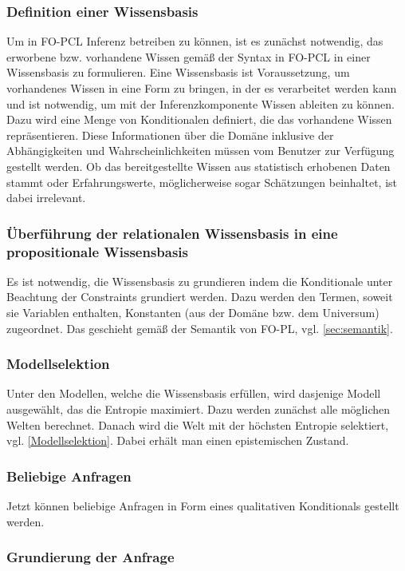 \documentclass[draft]{scrreprt}
\begin{document}
\subsubsection{Definition einer Wissensbasis}	
Um in FO-PCL Inferenz betreiben zu können, ist es zunächst notwendig, das erworbene bzw. vorhandene Wissen gemäß der Syntax in FO-PCL in einer Wissensbasis zu formulieren. Eine Wissensbasis ist Voraussetzung, um vorhandenes Wissen in eine Form zu bringen, in der es verarbeitet werden kann und ist notwendig, um mit der Inferenzkomponente Wissen ableiten zu können. Dazu wird eine Menge von Konditionalen definiert, die das vorhandene Wissen repräsentieren.  Diese Informationen über die Domäne inklusive der Abhängigkeiten und Wahrscheinlichkeiten müssen vom Benutzer zur Verfügung gestellt werden. Ob das bereitgestellte Wissen aus statistisch erhobenen Daten stammt oder Erfahrungswerte, möglicherweise sogar Schätzungen beinhaltet, ist dabei irrelevant.

\subsubsection{Überführung der relationalen Wissensbasis in eine propositionale Wissensbasis}
Es ist notwendig, die Wissensbasis zu grundieren indem die Konditionale unter Beachtung der Constraints grundiert werden. Dazu werden den Termen, soweit sie Variablen enthalten, Konstanten (aus der Domäne bzw. dem Universum) zugeordnet. Das geschieht gemäß der Semantik von FO-PL, vgl. \ref{sec:semantik}.
	
\subsubsection{Modellselektion}
Unter den Modellen, welche die Wissensbasis erfüllen, wird dasjenige Modell ausgewählt, das die Entropie maximiert. Dazu werden zunächst alle möglichen Welten berechnet. Danach wird die Welt mit der höchsten Entropie selektiert, vgl. \ref{Modellselektion}. Dabei erhält man einen epistemischen Zustand.
	
\subsubsection{Beliebige Anfragen}
Jetzt können beliebige Anfragen in Form eines qualitativen Konditionals gestellt werden.   

\subsubsection{Grundierung der Anfrage}
\end{document}

